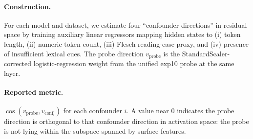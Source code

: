 \paragraph{Construction.}
For each model and dataset, we estimate four ``confounder directions''
in residual space by training auxiliary linear regressors mapping
hidden states to (i) token length, (ii) numeric token count,
(iii) Flesch reading-ease proxy, and (iv) presence of insufficient
lexical cues. The probe direction $v_{\text{probe}}$ is the
StandardScaler-corrected logistic-regression weight from the unified
exp10 probe at the same layer.

\paragraph{Reported metric.}
$\cos(v_{\text{probe}}, v_{\text{conf}_i})$ for each confounder $i$.
A value near $0$ indicates the probe direction is orthogonal to that
confounder direction in activation space: the probe is not lying within
the subspace spanned by surface features.

